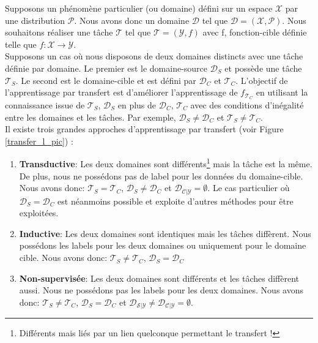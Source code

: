 \noindent Supposons un phénomène particulier (ou domaine) défini sur un espace $\mathcal{X}$ par une distribution $\mathcal{P}$. Nous avons donc un domaine $\mathcal{D}$ tel que $\mathcal{D}=(\mathcal{X}, \mathcal{P})$. Nous souhaitons réaliser une tâche $\mathcal{T}$ tel que $\mathcal{T}=(\mathcal{Y},f)$ avec f, fonction-cible définie telle que $f:\mathcal{X} \rightarrow \mathcal{Y}$.\\

\noindent Supposons un cas où nous disposons de deux domaines distincts avec une tâche définie par domaine. Le premier est le domaine-source $\mathcal{D}_S$ et possède une tâche $\mathcal{T}_S$. Le second est le domaine-cible et est défini par $\mathcal{D}_C$ et $\mathcal{T}_C$. L'objectif de l'apprentissage par transfert est d'améliorer l'apprentissage de $f_{\mathcal{T}_C}$ en utilisant la connaissance issue de $\mathcal{T}_S$, $\mathcal{D}_S$ en plus de $\mathcal{D}_C$, $\mathcal{T}_C$ avec des conditions d'inégalité entre les domaines et les tâches. Par exemple, $\mathcal{D}_S \neq \mathcal{D}_C$ et $\mathcal{T}_S \neq \mathcal{T}_C$. \\

\noindent Il existe trois grandes approches d'apprentissage par transfert (voir Figure \ref{transfer_l_pic}) :
\begin{enumerate}
    \item \textbf{Transductive}: Les deux domaines sont différents\footnote{Différents mais liés par un lien quelconque permettant le transfert !} mais la tâche est la même. De plus, nous ne possédons pas de label pour les données du domaine-cible. Nous avons donc:  $\mathcal{T}_S = \mathcal{T}_C$, $\mathcal{D}_S \neq \mathcal{D}_C$ et $\mathcal{D_{C|Y}}= \emptyset$. Le cas particulier où $\mathcal{D}_S = \mathcal{D}_C$ est néanmoins possible et exploite d'autres méthodes pour être exploitées. \\

    \item \textbf{Inductive}: Les deux domaines sont identiques mais les tâches diffèrent. Nous possédons les labels pour les deux domaines ou uniquement pour le domaine cible. Nous avons donc: $\mathcal{T}_S \neq \mathcal{T}_C$, $\mathcal{D}_S = \mathcal{D}_C$\\

    \item \textbf{Non-supervisée}: Les deux domaines sont différents et les tâches diffèrent aussi. Nous ne possédons pas les labels pour les deux domaines. Nous avons donc: $\mathcal{T}_S \neq \mathcal{T}_C$, $\mathcal{D}_S = \mathcal{D}_C$ et $\mathcal{D_{S|Y}} \neq \mathcal{D_{C|Y}}=\emptyset$.\\
\end{enumerate}

